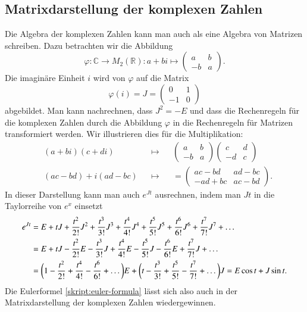 \subsection{Matrixdarstellung der komplexen Zahlen\label{subsection:matrixdarstellung}}
Die Algebra der komplexen Zahlen kann man auch als eine Algebra von Matrizen
schreiben. Dazu betrachten wir die Abbildung
\[
\varphi\colon
\mathbb C\to M_2(\mathbb R):
a+bi\mapsto\begin{pmatrix}a&b\\-b&a\end{pmatrix}.
\]
Die imaginäre Einheit $i$ wird von $\varphi$ auf die Matrix
\[
\varphi(i)=J=\begin{pmatrix}0&1\\-1&0\end{pmatrix}
\]
abgebildet. Man kann nachrechnen, dass $J^2=-E$ und dass die Rechenregeln
für die komplexen Zahlen durch die Abbildung $\varphi$ in die Rechenregeln
für Matrizen transformiert werden.
Wir illustrieren dies für die Multiplikation:
\[
\begin{aligned}
&(a+bi)(c+di)&&\mapsto&
&\begin{pmatrix}a&b\\-b&a\end{pmatrix}
\begin{pmatrix}c&d\\-d&c\end{pmatrix}
\\
&(ac-bd) + i(ad-bc)&&\mapsto&
&=\begin{pmatrix}
ac-bd&ad-bc\\
-ad+bc&ac-bd
\end{pmatrix}.
\end{aligned}
\]
In dieser Darstellung kann man auch $e^{Jt}$ ausrechnen, indem man $Jt$ in
die Taylorreihe von $e^x$ einsetzt
\begin{align}
e^{Jt}
&=
E + tJ + \frac{t^2}{2!} J^2 + \frac{t^3}{3!} J^3 + \frac{t^4}{4!} J^4
 + \frac{t^5}{5!} J^5 + \frac{t^6}{6!} J^6 + \frac{t^7}{7!} J^7 + \dots
\notag
\\
&=
E + tJ - \frac{t^2}{2!} E - \frac{t^3}{3!} J + \frac{t^4}{4!} E
 - \frac{t^5}{5!} J - \frac{t^6}{6!} E + \frac{t^7}{7!} J + \dots
\notag
\\
&=\biggl(1 - \frac{t^2}{2!} + \frac{t^4}{4!} - \frac{t^6}{6!} + \dots\biggr) E
+ \biggl(t - \frac{t^3}{3!} + \frac{t^5}{5!} - \frac{t^7}{7!} + \dots\biggr) J
= E \cos t + J \sin t.
\label{skript:eulermatrixdarstellung}
\end{align}
Die Eulerformel \eqref{skript:euler-formula} lässt sich also auch in der
Matrixdarstellung der komplexen Zahlen wiedergewinnen.

